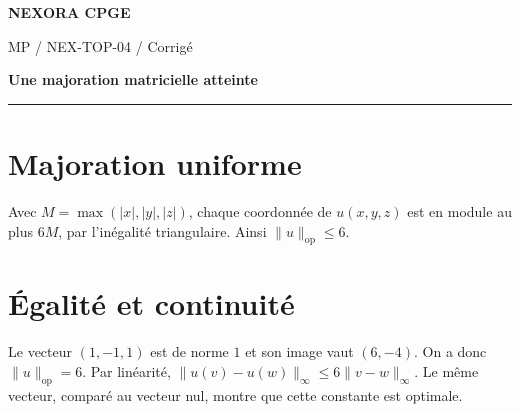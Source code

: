 \documentclass[11pt,a4paper]{article}
\begin{document}
{\small\bfseries\color{nexorablue} NEXORA CPGE}\par
{\small MP / NEX-TOP-04 / Corrigé}\par
{\LARGE\bfseries Une majoration matricielle atteinte}\par
\vspace{0.25em}\hrule\vspace{0.6em}

\section*{Majoration uniforme}
Avec $M=\max(|x|,|y|,|z|)$, chaque coordonnée de $u(x,y,z)$ est en module au plus $6M$, par l’inégalité triangulaire. Ainsi $\|u\|_{\mathrm{op}}\le6$.

\section*{Égalité et continuité}
Le vecteur $(1,-1,1)$ est de norme $1$ et son image vaut $(6,-4)$. On a donc $\|u\|_{\mathrm{op}}=6$. Par linéarité, $\|u(v)-u(w)\|_\infty\le6\|v-w\|_\infty$. Le même vecteur, comparé au vecteur nul, montre que cette constante est optimale.
\end{document}
